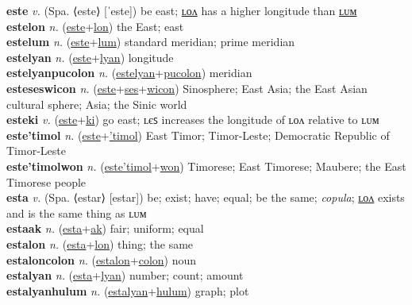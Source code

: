 \textbf{este} \textit{v.} (Spa. ⟨este⟩ [ˈeste])
be east; \hyperref[estelon]{ʟᴏᴧ} has a higher longitude than \hyperref[estelum]{ʟᴜᴍ} \label{este} \\
\textbf{estelon} \textit{n.} (\hyperref[este]{este}+\hyperref[lon]{lon})
the East; east \label{estelon} \\
\textbf{estelum} \textit{n.} (\hyperref[este]{este}+\hyperref[lum]{lum})
standard meridian; prime meridian \label{estelum} \\
\textbf{estelyan} \textit{n.} (\hyperref[este]{este}+\hyperref[lyan]{lyan})
longitude \label{estelyan} \\
\textbf{estelyanpucolon} \textit{n.} (\hyperref[estelyan]{estelyan}+\hyperref[pucolon]{pucolon})
meridian \label{estelyanpucolon} \\
\textbf{esteseswicon} \textit{n.} (\hyperref[este]{este}+\hyperref[ses]{ses}+\hyperref[wicon]{wicon})
Sinosphere; East Asia; the East Asian cultural sphere; Asia; the Sinic world \label{esteseswicon} \\
\textbf{esteki} \textit{v.} (\hyperref[este]{este}+\hyperref[ki]{ki})
go east; ʟєꜱ increases the longitude of ʟᴏᴧ relative to ʟᴜᴍ \label{esteki} \\
\textbf{este'timol} \textit{n.} (\hyperref[este]{este}+\hyperref['timol]{'timol})
East Timor; Timor-Leste; Democratic Republic of Timor-Leste \label{este'timol} \\
\textbf{este'timolwon} \textit{n.} (\hyperref[este'timol]{este'timol}+\hyperref[won]{won})
Timorese; East Timorese; Maubere; the East Timorese people \label{este'timolwon} \\
\textbf{esta} \textit{v.} (Spa. ⟨estar⟩ [estar])
be; exist; have; equal; be the same; \textit{copula}; \hyperref[estalon]{ʟᴏᴧ} exists and is the same thing as ʟᴜᴍ \label{esta} \\
\textbf{estaak} \textit{n.} (\hyperref[esta]{esta}+\hyperref[ak]{ak})
fair; uniform; equal \label{estaak} \\
\textbf{estalon} \textit{n.} (\hyperref[esta]{esta}+\hyperref[lon]{lon})
thing; the same \label{estalon} \\
\textbf{estaloncolon} \textit{n.} (\hyperref[estalon]{estalon}+\hyperref[colon]{colon})
noun \label{estaloncolon} \\
\textbf{estalyan} \textit{n.} (\hyperref[esta]{esta}+\hyperref[lyan]{lyan})
number; count; amount \label{estalyan} \\
\textbf{estalyanhulum} \textit{n.} (\hyperref[estalyan]{estalyan}+\hyperref[hulum]{hulum})
graph; plot \label{estalyanhulum} \\
